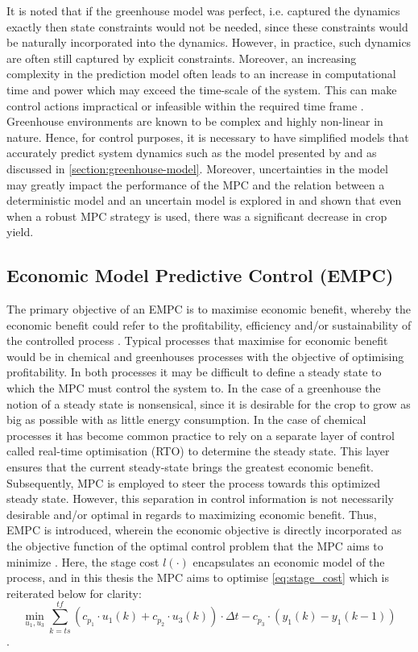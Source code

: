 It is noted that if the greenhouse model was perfect, i.e. captured the dynamics exactly then state constraints would not be needed, since these constraints would be naturally incorporated into the dynamics. However, in practice, such dynamics are often still captured by explicit constraints. Moreover, an increasing complexity in the prediction model often leads to an increase in computational time and power which may exceed the time-scale of the system. This can make control actions impractical or infeasible within the required time frame \cite{rawlingsModelPredictiveControl2017}. Greenhouse environments are known to be complex and highly non-linear in nature. Hence, for control purposes,  it is necessary to have simplified models that accurately predict system dynamics such as the model presented by \citet{hentenGreenhouseClimateManagement1994} and as discussed in \autoref{section:greenhouse-model}. Moreover, uncertainties in the model may greatly impact the performance of the MPC and the relation between a deterministic model and an uncertain model is explored in \citet{boersmaRobustSamplebasedModel2022} and shown that even when a robust MPC strategy is used, there was a significant decrease in crop yield.

\subsection{Economic Model Predictive Control (EMPC)}
The primary objective of an EMPC is to maximise economic benefit, whereby the economic benefit could refer to the profitability, efficiency and/or sustainability of the controlled process \cite{ellisTutorialReviewEconomic2014}. Typical processes that maximise for economic benefit would be in chemical and greenhouses processes with the objective of optimising profitability. In both processes it may be difficult to define a steady state to which the MPC must control the system to. In the case of a greenhouse the notion of a steady state is nonsensical, since it is desirable for the crop to grow as big as possible with as little energy consumption. In the case of chemical processes it has become common practice to rely on a separate layer of control called real-time optimisation (RTO) to determine the steady state. This layer ensures that the current steady-state brings the greatest economic benefit. Subsequently, MPC is employed to steer the process towards this optimized steady state. However, this separation in control information is not necessarily desirable and/or optimal in regards to maximizing economic benefit. Thus, EMPC is introduced, wherein the economic objective is directly incorporated as the objective function of the optimal control problem that the MPC aims to minimize \cite{rawlingsFundamentalsEconomicModel2012}. Here, the stage cost $l(\cdot)$ encapsulates an economic model of the process, and in this thesis the MPC aims to optimise \autoref{eq:stage_cost} which is reiterated below for clarity: $$\min_{u_1,u_3} \sum_{k = ts}^{tf} {(c_{p_1} \cdot u_1(k) + c_{p_2} \cdot u_3(k))\cdot \Delta t - c_{p_3} \cdot (y_1(k) - y_1(k-1))}$$.

